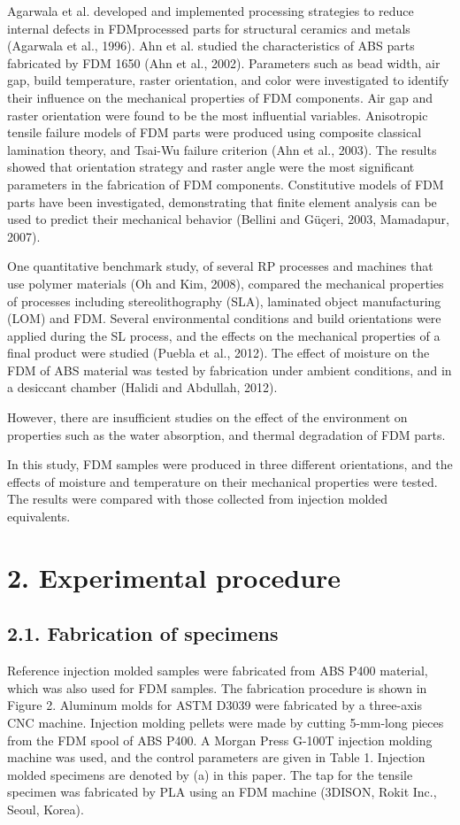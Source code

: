 \documentclass[10pt]{article}
\begin{document}
Agarwala et al. developed and implemented processing strategies to reduce internal defects in FDMprocessed parts for structural ceramics and metals (Agarwala et al., 1996). Ahn et al. studied the characteristics of ABS parts fabricated by FDM 1650 (Ahn et al., 2002). Parameters such as bead width, air gap, build temperature, raster orientation, and color were investigated to identify their influence on the mechanical properties of FDM components. Air gap and raster orientation were found to be the most influential variables. Anisotropic tensile failure models of FDM parts were produced using composite classical lamination theory, and Tsai-Wu failure criterion (Ahn et al., 2003). The results showed that orientation strategy and raster angle were the most significant parameters in the fabrication of FDM components. Constitutive models of FDM parts have been investigated, demonstrating that finite element analysis can be used to predict their mechanical behavior (Bellini and Güçeri, 2003, Mamadapur, 2007).

One quantitative benchmark study, of several RP processes and machines that use polymer materials (Oh and Kim, 2008), compared the mechanical properties of processes including stereolithography (SLA), laminated object manufacturing (LOM) and FDM. Several environmental conditions and build orientations were applied during the SL process, and the effects on the mechanical properties of a final product were studied (Puebla et al., 2012). The effect of moisture on the FDM of ABS material was tested by fabrication under ambient conditions, and in a desiccant chamber (Halidi and Abdullah, 2012).

However, there are insufficient studies on the effect of the environment on properties such as the water absorption, and thermal degradation of FDM parts.

In this study, FDM samples were produced in three different orientations, and the effects of moisture and temperature on their mechanical properties were tested. The results were compared with those collected from injection molded equivalents.

\section*{2. Experimental procedure}
\subsection*{2.1. Fabrication of specimens}
Reference injection molded samples were fabricated from ABS P400 material, which was also used for FDM samples. The fabrication procedure is shown in Figure 2. Aluminum molds for ASTM D3039 were fabricated by a three-axis CNC machine. Injection molding pellets were made by cutting 5-mm-long pieces from the FDM spool of ABS P400. A Morgan Press G-100T injection molding machine was used, and the control parameters are given in Table 1. Injection molded specimens are denoted by (a) in this paper. The tap for the tensile specimen was fabricated by PLA using an FDM machine (3DISON, Rokit Inc., Seoul, Korea).
\end{document}
